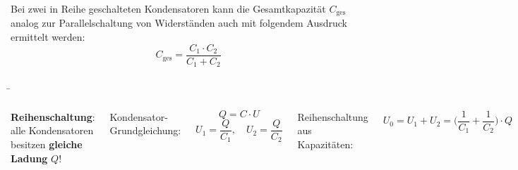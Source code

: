 \begin{frame}
{		 
		Bei zwei in Reihe geschalteten Kondensatoren kann die Gesamtkapazität $C_\mathrm{ges}$ analog zur 
		Parallelschaltung von Widerständen auch mit folgendem Ausdruck ermittelt werden:\\

		\begin{equation*}
			C_\mathrm{ges} = \frac{C_1 \cdot C_2}{C_1 + C_2}
		\end{equation*}
		
       

	 
 






		}



	\b{
    \begin{columns}

		\vspace{-110pt}

		\textbf{Reihenschaltung}: alle Kondensatoren besitzen \textbf{gleiche Ladung} $Q$!\\

		\vspace*{5pt}
 
        Kondensator-Grundgleichung:

		\begin{equation*}
			Q= C \cdot U
		\end{equation*}
\vspace*{-10pt}
		\begin{equation*}
			U_1 = \frac{Q}{C_1}, \quad U_2 = \frac{Q}{C_2}
		\end{equation*}

		Reihenschaltung aus Kapazitäten:
		\vspace*{-10pt}

		\begin{equation*}
			U_0 = U_1 + U_2 = \bigg( \frac{1}{C_1} + \frac{1}{C_2} \bigg) \cdot Q
		\end{equation*}

		Ersatzschaltbild:

		\vspace*{-10pt}

		\begin{equation*}
			U_0 = \frac{1}{C_\mathrm{ges}} \cdot Q
		\end{equation*}


\end{columns}}
\end{frame}
